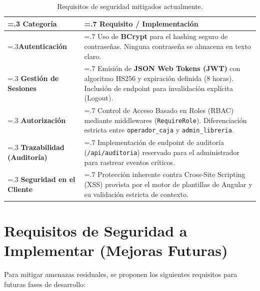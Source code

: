 \documentclass[12pt,a4paper]{article}
\begin{document}
\begin{table}[h!]
\centering
\begin{tabularx}{\textwidth}{|>{\hsize=.3\hsize}X|>{\hsize=.7\hsize}X|}
\hline
\rowcolor{gray!20} \textbf{Categoría} & \textbf{Requisito / Implementación} \\ \hline
\textbf{Autenticación} & Uso de \textbf{BCrypt} para el hashing seguro de contraseñas. Ninguna contraseña se almacena en texto claro. \\ \hline
\textbf{Gestión de Sesiones} & Emisión de \textbf{JSON Web Tokens (JWT)} con algoritmo HS256 y expiración definida (8 horas). Inclusión de endpoint para invalidación explícita (Logout). \\ \hline
\textbf{Autorización} & Control de Acceso Basado en Roles (RBAC) mediante middlewares (\texttt{RequireRole}). Diferenciación estricta entre \texttt{operador\_caja} y \texttt{admin\_libreria}. \\ \hline
\textbf{Trazabilidad (Auditoría)} & Implementación de endpoint de auditoría (\texttt{/api/auditoria}) reservado para el administrador para rastrear eventos críticos. \\ \hline
\textbf{Seguridad en el Cliente} & Protección inherente contra Cross-Site Scripting (XSS) provista por el motor de plantillas de Angular y su validación estricta de contexto. \\ \hline
\end{tabularx}
\caption{Requisitos de seguridad mitigados actualmente.}
\end{table}

\section{Requisitos de Seguridad a Implementar (Mejoras Futuras)}
Para mitigar amenazas residuales, se proponen los siguientes requisitos para futuras fases de desarrollo:
\end{document}
